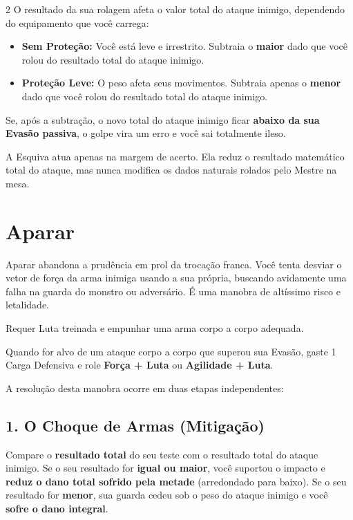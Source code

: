 \documentclass[a4paper,11pt,openany]{book}
\begin{document}
\begin{multicols}{2}
O resultado da sua rolagem afeta o valor total do ataque inimigo, dependendo do equipamento que você carrega:
\\
\begin{itemize}
    \item \textbf{Sem Proteção:} Você está leve e irrestrito. Subtraia o \textbf{maior} dado que você rolou do resultado total do ataque inimigo.
    \item \textbf{Proteção Leve:} O peso afeta seus movimentos. Subtraia apenas o \textbf{menor} dado que você rolou do resultado total do ataque inimigo.
\end{itemize}

Se, após a subtração, o novo total do ataque inimigo ficar \textbf{abaixo da sua Evasão passiva}, o golpe vira um erro e você sai totalmente ileso.

\begin{regra}
A Esquiva atua apenas na margem de acerto. Ela reduz o resultado matemático total do ataque, mas nunca modifica os dados naturais rolados pelo Mestre na mesa.
\end{regra}

\section{Aparar}

Aparar abandona a prudência em prol da trocação franca. Você tenta desviar o vetor de força da arma inimiga usando a sua própria, buscando avidamente uma falha na guarda do monstro ou adversário. É uma manobra de altíssimo risco e letalidade.

\begin{regra}
Requer Luta treinada e empunhar uma arma corpo a corpo adequada.
\end{regra}

Quando for alvo de um ataque corpo a corpo que superou sua Evasão, gaste 1 Carga Defensiva e role \textbf{Força + Luta} ou \textbf{Agilidade + Luta}. 

A resolução desta manobra ocorre em duas etapas independentes:

\subsection*{1. O Choque de Armas (Mitigação)}
Compare o \textbf{resultado total} do seu teste com o resultado total do ataque inimigo. 
Se o seu resultado for \textbf{igual ou maior}, você suportou o impacto e \textbf{reduz o dano total sofrido pela metade} (arredondado para baixo). 
Se o seu resultado for \textbf{menor}, sua guarda cedeu sob o peso do ataque inimigo e você \textbf{sofre o dano integral}.


\end{multicols}
\end{document}
